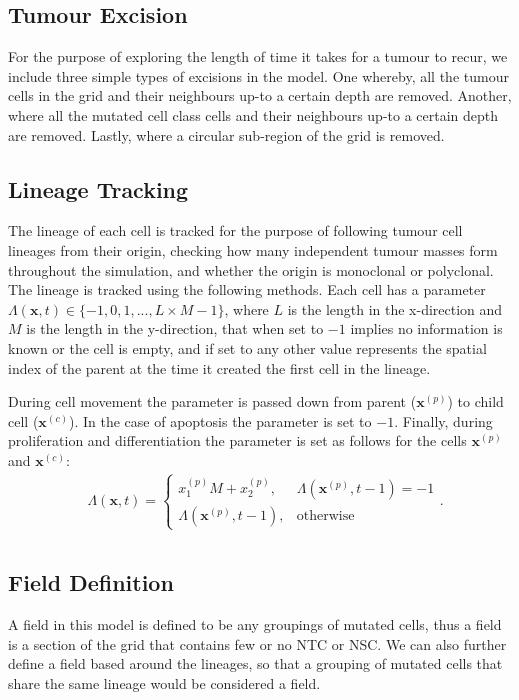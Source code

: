 \documentclass[\main/thesis.tex]{subfiles}
\begin{document}
\subsection{Tumour Excision}
For the purpose of exploring the length of time it takes for a tumour to recur, we include three simple types of excisions in the model. One whereby, all the tumour cells in the grid and their neighbours up-to a certain depth are removed. Another, where all the mutated cell class cells and their neighbours up-to a certain depth are removed. Lastly, where a circular sub-region of the grid is removed. 

\subsection{Lineage Tracking}
The lineage of each cell is tracked for the purpose of following tumour cell lineages from their origin, checking how many independent tumour masses form throughout the simulation, and whether the origin is monoclonal or polyclonal. The lineage is tracked using the following methods. Each cell has a parameter
$\Lambda(\boldsymbol{x}, t) {\in} \{ {-}1, 0, 1, ..., L {\times} M {-} 1 \}$, where $L$ is the length in the x-direction and $M$ is the length in the y-direction, that when set to ${-}1$ implies no information is known or the cell is empty, and if set to any other value represents the spatial index of the parent at the time it created the first cell in the lineage. 

During cell movement the parameter is passed down from parent ($\boldsymbol{x}^{(p)}$) to child cell ($\boldsymbol{x}^{(c)}$). In the case of apoptosis the parameter is set to ${-}1$. Finally, during proliferation and differentiation the parameter is set as follows for the cells $\boldsymbol{x}^{(p)}$ and $\boldsymbol{x}^{(c)}$:
\begin{align}
&\Lambda(\boldsymbol{x}, t) {=} \begin{cases}
                           x_1^{(p)} M {+} x_2^{(p)},
                            & \Lambda(\boldsymbol{x}^{(p)}, t{-}1) {=} -1 \\
                           \Lambda(\boldsymbol{x}^{(p)}, t{-}1), 
                            & \text{otherwise}
                          \end{cases}.\label{eq:LineageTracker}\\
\end{align}

\subsection{Field Definition}
A field in this model is defined to be any groupings of mutated cells, thus a field is a section of the grid that contains few or no NTC or NSC. 
We can also further define a field based around the lineages, so that a grouping of mutated cells that share the same lineage would be considered a field. 
\end{document}
